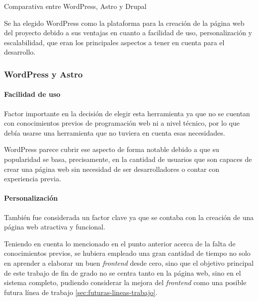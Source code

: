 \begin{table}[!htbp]
                \caption{Comparativa entre WordPress, Astro y Drupal}
                \label{tab:wordpress-vs-astro-vs-drupal}
            \end{table}

            Se ha elegido WordPress como la plataforma para la creación de la página web del proyecto debido a sus ventajas en cuanto a facilidad de uso, personalización y escalabilidad, que eran los principales aspectos a tener en cuenta para el desarrollo.

            
            \subsubsection{WordPress y Astro}

            \paragraph{Facilidad de uso}
                
                Factor importante en la decisión de elegir esta herramienta ya que no se cuentan con conocimientos previos de programación web ni a nivel técnico, por lo que debía usarse una herramienta que no tuviera en cuenta esas necesidades.
                
                WordPress parece cubrir ese aspecto de forma notable debido a que su popularidad se basa, precisamente, en la cantidad de usuarios que son capaces de crear una página web sin necesidad de ser desarrolladores o contar con experiencia previa.
            
            \paragraph{Personalización}
            
                También fue considerada un factor clave ya que se contaba con la creación de una página web atractiva y funcional.
                
                Teniendo en cuenta lo mencionado en el punto anterior acerca de la falta de conocimientos previos, se hubiera empleado una gran cantidad de tiempo no solo en aprender a elaborar un buen \textit{frontend} desde cero, sino que el objetivo principal de este trabajo de fin de grado no se centra tanto en la página web, sino en el sistema completo, pudiendo considerar la mejora del \textit{frontend} como una posible futura línea de trabajo \ref{sec:futuras-lineas-trabajo}.
            
